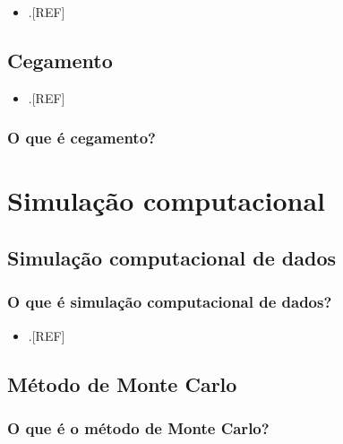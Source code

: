 \documentclass[
  a4paper,
]{book}
\providecommand{\tightlist}{%
  \setlength{\itemsep}{0pt}\setlength{\parskip}{0pt}}
\begin{document}
\begin{itemize}
\tightlist
\item
  .{[}REF{]}
\end{itemize}

\hypertarget{cegamento}{%
\section{Cegamento}\label{cegamento}}

\begin{itemize}
\tightlist
\item
  .{[}REF{]}
\end{itemize}

\hypertarget{o-que-uxe9-cegamento}{%
\subsection{O que é cegamento?}\label{o-que-uxe9-cegamento}}

\hypertarget{simulacao-computacional}{%
\chapter{\texorpdfstring{\textbf{Simulação computacional}}{Simulação computacional}}\label{simulacao-computacional}}

\hypertarget{simulacao-computacional-dados}{%
\section{Simulação computacional de dados}\label{simulacao-computacional-dados}}

\hypertarget{o-que-uxe9-simulauxe7uxe3o-computacional-de-dados}{%
\subsection{O que é simulação computacional de dados?}\label{o-que-uxe9-simulauxe7uxe3o-computacional-de-dados}}

\begin{itemize}
\tightlist
\item
  .{[}REF{]}
\end{itemize}

\hypertarget{monte-carlo}{%
\section{Método de Monte Carlo}\label{monte-carlo}}

\hypertarget{o-que-uxe9-o-muxe9todo-de-monte-carlo}{%
\subsection{O que é o método de Monte Carlo?}\label{o-que-uxe9-o-muxe9todo-de-monte-carlo}}
\end{document}
